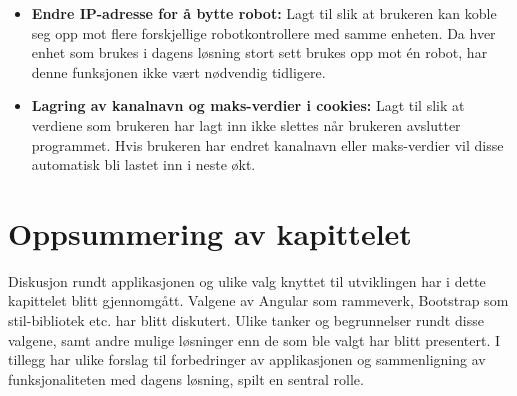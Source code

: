 \begin{itemize}
    \item \textbf{Endre IP-adresse for å bytte robot:} Lagt til slik at brukeren kan koble seg opp mot flere forskjellige robotkontrollere med samme enheten. Da hver enhet som brukes i dagens løsning stort sett brukes opp mot én robot, har denne funksjonen ikke vært nødvendig tidligere.
    \item \textbf{Lagring av kanalnavn og maks-verdier i cookies:} Lagt til slik at verdiene som brukeren har lagt inn ikke slettes når brukeren avslutter programmet. Hvis brukeren har endret kanalnavn eller maks-verdier vil disse automatisk bli lastet inn i neste økt.
\end{itemize}

\section{Oppsummering av kapittelet}
Diskusjon rundt applikasjonen og ulike valg knyttet til utviklingen har i dette kapittelet blitt gjennomgått. Valgene av Angular som rammeverk, Bootstrap som stil-bibliotek etc. har blitt diskutert. Ulike tanker og begrunnelser rundt disse valgene, samt andre mulige løsninger enn de som ble valgt har blitt presentert. I tillegg har ulike forslag til forbedringer av applikasjonen og sammenligning av funksjonaliteten med dagens løsning, spilt en sentral rolle. 
